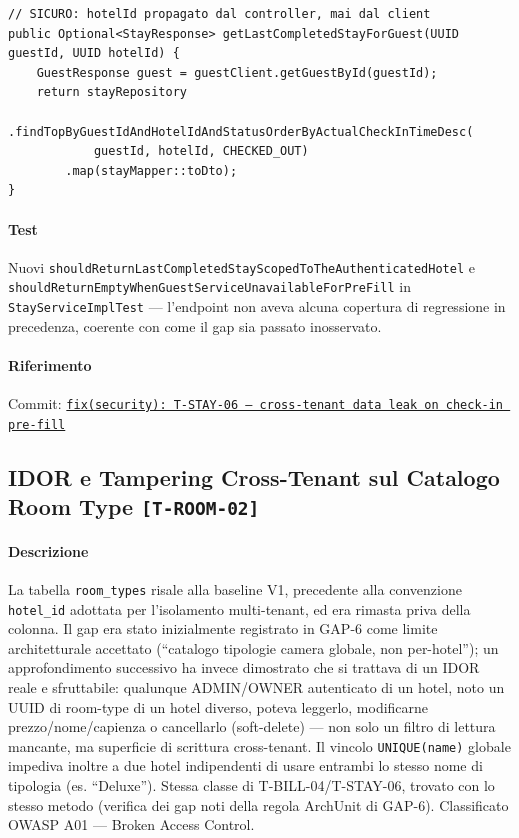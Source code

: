 ﻿\documentclass[a4paper,12pt]{report}
\newcommand{\commitref}[2]{\texttt{\small \href{https://github.com/diegoandruccioli/hotel-pms/commit/#1}{#2}}}
\newcommand{\threat}[1]{\texttt{\small\textcolor{vulnred}{[#1]}}}
\begin{document}
\begin{securebox}[title={Codice Sicuro --- StayServiceImpl.java (fix)}]
\begin{lstlisting}[style=java]
// SICURO: hotelId propagato dal controller, mai dal client
public Optional<StayResponse> getLastCompletedStayForGuest(UUID guestId, UUID hotelId) {
    GuestResponse guest = guestClient.getGuestById(guestId);
    return stayRepository
        .findTopByGuestIdAndHotelIdAndStatusOrderByActualCheckInTimeDesc(
            guestId, hotelId, CHECKED_OUT)
        .map(stayMapper::toDto);
}
\end{lstlisting}
\end{securebox}

\paragraph{Test}
Nuovi \texttt{shouldReturnLastCompletedStayScopedToTheAuthenticatedHotel} e
\texttt{shouldReturnEmptyWhenGuestServiceUnavailableForPreFill} in
\texttt{StayServiceImplTest} --- l'endpoint non aveva alcuna copertura di regressione
in precedenza, coerente con come il gap sia passato inosservato.

\paragraph{Riferimento} Commit: \commitref{6e5bc0e}{fix(security): T-STAY-06 --- cross-tenant data leak on check-in pre-fill}

\subsection{IDOR e Tampering Cross-Tenant sul Catalogo Room Type \threat{T-ROOM-02}}

\paragraph{Descrizione}
La tabella \texttt{room\_types} risale alla baseline V1, precedente alla convenzione
\texttt{hotel\_id} adottata per l'isolamento multi-tenant, ed era rimasta priva della
colonna. Il gap era stato inizialmente registrato in GAP-6 come limite architetturale
accettato (``catalogo tipologie camera globale, non per-hotel''); un approfondimento
successivo ha invece dimostrato che si trattava di un IDOR reale e sfruttabile: qualunque
ADMIN/OWNER autenticato di un hotel, noto un UUID di room-type di un hotel diverso,
poteva leggerlo, modificarne prezzo/nome/capienza o cancellarlo (soft-delete) --- non
solo un filtro di lettura mancante, ma superficie di scrittura cross-tenant. Il vincolo
\texttt{UNIQUE(name)} globale impediva inoltre a due hotel indipendenti di usare entrambi
lo stesso nome di tipologia (es. ``Deluxe''). Stessa classe di T-BILL-04/T-STAY-06,
trovato con lo stesso metodo (verifica dei gap noti della regola ArchUnit di GAP-6).
Classificato OWASP A01 --- Broken Access Control.
\end{document}
